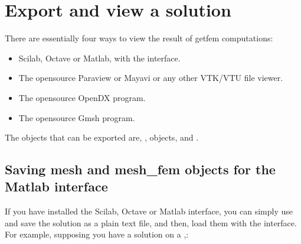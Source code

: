 \documentclass[a4paper,11pt,english]{sphinxmanual}
\begin{document}
\chapter{Export and view a solution}
\label{\detokenize{userdoc/export:export-and-view-a-solution}}\label{\detokenize{userdoc/export:ud-export}}\label{\detokenize{userdoc/export::doc}}
There are essentially four ways to view the result of getfem computations:
\begin{itemize}
\item {} 
Scilab, Octave or Matlab, with the interface.

\item {} 
The open\sphinxhyphen{}source Paraview or Mayavi or any other VTK/VTU file viewer.

\item {} 
The open\sphinxhyphen{}source OpenDX program.

\item {} 
The open\sphinxhyphen{}source Gmsh program.

\end{itemize}

The objects that can be exported are, ,  objects, and .


\section{Saving mesh and mesh\_fem objects for the Matlab interface}
\label{\detokenize{userdoc/export:saving-mesh-and-mesh-fem-objects-for-the-matlab-interface}}
If you have installed the Scilab, Octave or Matlab interface, you can simply use
 and save the solution as a plain text file, and then,
load them with the interface. For example, supposing you have a solution  on a 
,:

\begin{sphinxVerbatim}[commandchars=\\\{\}]
 
      
    \PYG{p}{[}\PYG{p}{]}  

 
\end{sphinxVerbatim}
\end{document}
